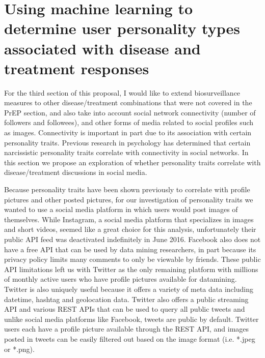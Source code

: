 \section{Using machine learning to determine user personality types associated with disease and treatment responses}

For the third section of this proposal, I would like to extend biosurveillance measures to other disease/treatment combinations that were not covered in the PrEP section, and also take into account social network connectivity (number of followers and followees), and other forms of media related to social profiles such as images. Connectivity is important in part due to its association with certain personality traits. Previous research in psychology has determined that certain narcissistic personality traits correlate with connectivity in social networks\cite{buffardi2008narcissism}. In this section we propose an exploration of whether personality traits correlate with disease/treatment discussions in social media.

Because personality traits have been shown previously to correlate with profile pictures and other posted pictures\cite{ong2011narcissism}, for our investigation of personality traits we wanted to use a social media platform in which users would post images of themselves. While Instagram, a social media platform that specializes in images and short videos, seemed like a great choice for this analysis, unfortunately their public API feed was deactivated indefinitely in June 2016. Facebook also does not have a free API that can be used by data mining researchers, in part because its privacy policy limits many comments to only be viewable by friends. These public API limitations left us with Twitter as the only remaining platform with millions of monthly active users who have profile pictures available for datamining. Twitter is also uniquely useful because it offers a variety of meta data including datetime, hashtag and geolocation data. Twitter also offers a public streaming API and various REST APIs that can be used to query all public tweets and unlike social media platforms like Facebook, tweets are public by default. Twitter users each have a profile picture available through the REST API, and images posted in tweets can be easily filtered out based on the image format (i.e. *.jpeg or *.png).


